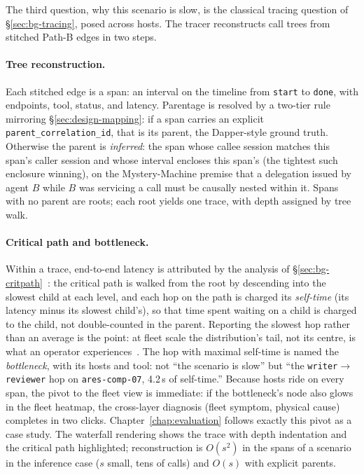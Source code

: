 The third question, why this scenario is slow, is the classical
tracing question of \S\ref{sec:bg-tracing}, posed across hosts. The tracer
reconstructs call trees from stitched Path-B edges in two steps.

\paragraph{Tree reconstruction.} Each stitched edge is a span: an interval
on the timeline from \texttt{start} to \texttt{done}, with endpoints,
tool, status, and latency. Parentage is resolved by a two-tier rule
mirroring \S\ref{sec:design-mapping}: if a span carries an explicit
\texttt{parent\_correlation\_id}, that is its parent, the
Dapper-style ground truth. Otherwise the parent is \emph{inferred}: the
span whose callee session matches this span's caller session and whose
interval encloses this span's (the tightest such enclosure winning),
on the Mystery-Machine premise that a delegation issued by agent $B$ while
$B$ was servicing a call must be causally nested within it. Spans with no
parent are roots; each root yields one trace, with depth assigned by tree
walk.

\paragraph{Critical path and bottleneck.} Within a trace, end-to-end
latency is attributed by the analysis of
\S\ref{sec:bg-critpath}~\cite{yang1988critpath}: the
critical path is walked from the root by descending into the slowest
child at each level, and each hop on the path is charged its
\emph{self-time} (its latency minus its slowest child's), so that
time spent waiting on a child is charged to the child, not double-counted
in the parent. Reporting the slowest hop rather than an average is the
point: at fleet scale the distribution's tail, not its centre, is what an
operator experiences~\cite{dean2013tail}. The hop with maximal self-time is named the
\emph{bottleneck}, with its hosts and tool: not ``the scenario is slow''
but ``the \texttt{writer}$\to$\texttt{reviewer} hop on
\texttt{ares-comp-07}, 4.2\,s of self-time.'' Because hosts ride on every
span, the pivot to the fleet view is immediate: if the bottleneck's node also glows in
the fleet heatmap, the cross-layer diagnosis (fleet symptom, physical
cause) completes in two clicks. Chapter~\ref{chap:evaluation} follows
exactly this pivot as a case study. The waterfall
rendering shows the trace with depth indentation and the critical path
highlighted; reconstruction is $O(s^2)$ in the spans of a scenario in the
inference case ($s$ small, tens of calls) and $O(s)$ with explicit
parents.

